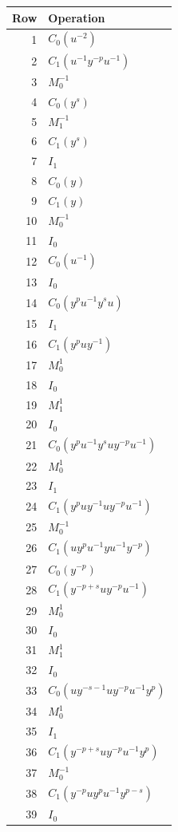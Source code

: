 \begin{longtable}{r@{\qquad}l}
\toprule
Row & Operation\\\midrule\endhead
1 & $C_{0}(u^{-2})$\\
2 & $C_{1}(u^{-1}y^{-p}u^{-1})$\\
3 & $M_{0}^{-1}$\\
4 & $C_{0}(y^{s})$\\
5 & $M_{1}^{-1}$\\
6 & $C_{1}(y^{s})$\\
7 & $I_{1}$\\
8 & $C_{0}(y)$\\
9 & $C_{1}(y)$\\
10 & $M_{0}^{-1}$\\
11 & $I_{0}$\\
12 & $C_{0}(u^{-1})$\\
13 & $I_{0}$\\
14 & $C_{0}(y^{p}u^{-1}y^{s}u)$\\
15 & $I_{1}$\\
16 & $C_{1}(y^{p}uy^{-1})$\\
17 & $M_{0}^{1}$\\
18 & $I_{0}$\\
19 & $M_{1}^{1}$\\
20 & $I_{0}$\\
21 & $C_{0}(y^{p}u^{-1}y^{s}uy^{-p}u^{-1})$\\
22 & $M_{0}^{1}$\\
23 & $I_{1}$\\
24 & $C_{1}(y^{p}uy^{-1}uy^{-p}u^{-1})$\\
25 & $M_{0}^{-1}$\\
26 & $C_{1}(uy^{p}u^{-1}yu^{-1}y^{-p})$\\
27 & $C_{0}(y^{-p})$\\
28 & $C_{1}(y^{-p+s}uy^{-p}u^{-1})$\\
29 & $M_{0}^{1}$\\
30 & $I_{0}$\\
31 & $M_{1}^{1}$\\
32 & $I_{0}$\\
33 & $C_{0}(uy^{-s-1}uy^{-p}u^{-1}y^{p})$\\
34 & $M_{0}^{1}$\\
35 & $I_{1}$\\
36 & $C_{1}(y^{-p+s}uy^{-p}u^{-1}y^{p})$\\
37 & $M_{0}^{-1}$\\
38 & $C_{1}(y^{-p}uy^{p}u^{-1}y^{p-s})$\\
39 & $I_{0}$\\

\end{longtable}
